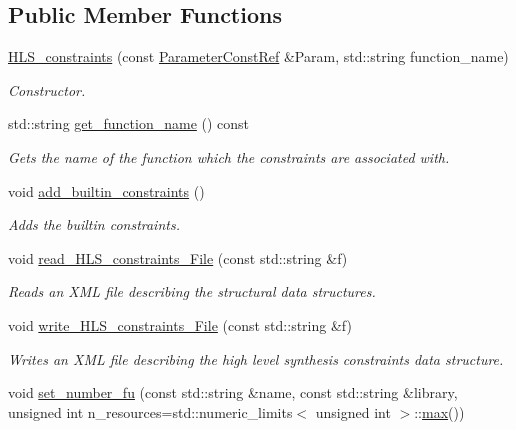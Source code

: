 \subsection*{Public Member Functions}
\begin{DoxyCompactItemize}
\item 
\hyperlink{classHLS__constraints_a53af44c5158085582b41f0ad2c6763bf}{H\+L\+S\+\_\+constraints} (const \hyperlink{Parameter_8hpp_a37841774a6fcb479b597fdf8955eb4ea}{Parameter\+Const\+Ref} \&Param, std\+::string function\+\_\+name)
\begin{DoxyCompactList}\small\item\em Constructor. \end{DoxyCompactList}\item 
std\+::string \hyperlink{classHLS__constraints_abbffb36768c52ff80a0b8cd24c5ab048}{get\+\_\+function\+\_\+name} () const
\begin{DoxyCompactList}\small\item\em Gets the name of the function which the constraints are associated with. \end{DoxyCompactList}\item 
void \hyperlink{classHLS__constraints_a26ccdc010e4ed339801844cb83392caa}{add\+\_\+builtin\+\_\+constraints} ()
\begin{DoxyCompactList}\small\item\em Adds the builtin constraints. \end{DoxyCompactList}\item 
void \hyperlink{classHLS__constraints_abd387f72baf392a410dcfba2995c0ef8}{read\+\_\+\+H\+L\+S\+\_\+constraints\+\_\+\+File} (const std\+::string \&f)
\begin{DoxyCompactList}\small\item\em Reads an X\+ML file describing the structural data structures. \end{DoxyCompactList}\item 
void \hyperlink{classHLS__constraints_ad69227a7f2d1c6266571737752438e21}{write\+\_\+\+H\+L\+S\+\_\+constraints\+\_\+\+File} (const std\+::string \&f)
\begin{DoxyCompactList}\small\item\em Writes an X\+ML file describing the high level synthesis constraints data structure. \end{DoxyCompactList}\item 
void \hyperlink{classHLS__constraints_afc848917bd7caf8c0187ccefdf14e3de}{set\+\_\+number\+\_\+fu} (const std\+::string \&name, const std\+::string \&library, unsigned int n\+\_\+resources=std\+::numeric\+\_\+limits$<$ unsigned int $>$\+::\hyperlink{tutorial__pact__2019_2Target-Customization_2first_2hint_8c_a28f422940797ea297699ba55d89171c5}{max}())

\end{DoxyCompactItemize}
